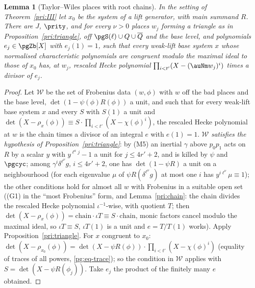\documentclass[10pt]{amsart}
\newtheorem{lemma}[theorem]{Lemma}
\theoremstyle{definition}
\theoremstyle{remark}
\begin{document}
\begin{lemma}[Taylor--Wiles places with root chains]\label{pri:TW}
In the setting of Theorem~\ref{pri:III} let $x_0$ be the system of a lift generator, with main
summand $R$. There are $J$, $\prity$, and for every $\nu>0$ places $w_j$ forming a triangle as in
Proposition~\ref{pri:triangle}, off $\pgS(\ell)\cup Q\cup\overline Q$ and the base level, and
polynomials $e_j\in\pgZb[X]$ with $e_j(1)=1$, such that every weak-lift base system $x$ whose
normalised characteristic polynomials are congruent modulo the maximal ideal to those of $x_0$ has,
at $w_j$, rescaled Hecke polynomial $\prod_{i<t'}(X-(\auNm w_j)^i)$ times a divisor of $e_j$.
\end{lemma}
\begin{proof}
Let $\mathcal W$ be the set of Frobenius data $(w,\phi)$ with $w$ off the bad places and the base
level, $\det(1-\psi(\phi)R(\phi))$ a unit, and such that for every weak-lift base system $x$ and every
$S$ with $S(1)$ a unit and $\det(X-\rho_x(\phi))\equiv S\cdot\prod_{i<t'}(X-\chi(\phi)^i)$, the rescaled
Hecke polynomial at $w$ is the chain times a divisor of an integral $e$ with $e(1)=1$. \emph{$\mathcal
W$ satisfies the hypothesis of Proposition~\ref{pri:triangle}}: by (M5) an inertial $\gamma$ above $p_0p_1$
acts on $R$ by a scalar $y$ with $y^{\ell^aj}-1$ a unit for $j\le4r'+2$, and is killed by $\psi$ and
$\pgcyc$; among $\gamma^i\delta^{\ell^\nu}g$, $i\le4r'+2$, one has $\det(1-\psi R)$ a unit on a
neighbourhood (for each eigenvalue $\mu$ of $\psi R(\delta^{\ell^\nu}g)$ at most one $i$ has $y^{i
\ell^\nu}\mu\equiv1$); the other conditions hold for almost all $w$ with Frobenius in a suitable open
set ((G1) in the ``most Frobenius'' form, and Lemma~\ref{pri:chain}: the chain divides the rescaled
Hecke polynomial $\iota^{-1}$-wise, with quotient $T$; then $\det(X-\rho_x(\phi))=\text{chain}\cdot
\iota T\equiv S\cdot\text{chain}$, monic factors cancel modulo the maximal ideal, so $\iota T\equiv S$,
$\iota T(1)$ is a unit and $e=T/T(1)$ works). Apply Proposition~\ref{pri:triangle}. For $x$ congruent
to $x_0$: $\det(X-\rho_{x_0}(\phi))=\det(X-\psi R(\phi))\cdot\prod_{i<t'}(X-\chi(\phi)^i)$ (equality of
traces of all powers, \eqref{pg:eq-trace}); so the condition in $\mathcal W$ applies with
$S=\det(X-\psi R(\phi_j))$. Take $e_j$ the product of the finitely many $e$ obtained.
\end{proof}
\end{document}
